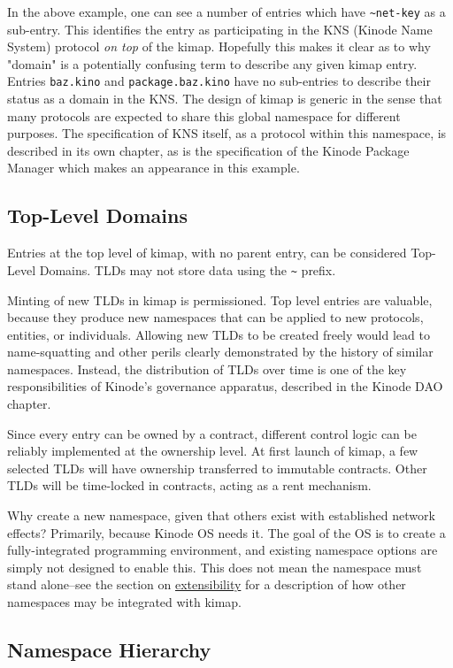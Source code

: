 \documentclass[runningheads]{llncs}
\begin{document}
In the above example, one can see a number of entries which have \verb|~net-key| as a sub-entry.
This identifies the entry as participating in the KNS (Kinode Name System) protocol \textit{on top} of the kimap.
Hopefully this makes it clear as to why "domain" is a potentially confusing term to describe any given kimap entry.
Entries \verb|baz.kino| and \verb|package.baz.kino| have no sub-entries to describe their status as a domain in the KNS.
The design of kimap is generic in the sense that many protocols are expected to share this global namespace for different purposes.
The specification of KNS itself, as a protocol within this namespace, is described in its own chapter, as is the specification of the Kinode Package Manager which makes an appearance in this example.

\subsection{Top-Level Domains}

Entries at the top level of kimap, with no parent entry, can be considered Top-Level Domains.
TLDs may not store data using the \verb|~| prefix.

Minting of new TLDs in kimap is permissioned.
Top level entries are valuable, because they produce new namespaces that can be applied to new protocols, entities, or individuals.
Allowing new TLDs to be created freely would lead to name-squatting and other perils clearly demonstrated by the history of similar namespaces.
Instead, the distribution of TLDs over time is one of the key responsibilities of Kinode's governance apparatus, described in the Kinode DAO chapter.

Since every entry can be owned by a contract, different control logic can be reliably implemented at the ownership level.
At first launch of kimap, a few selected TLDs will have ownership transferred to immutable contracts.
Other TLDs will be time-locked in contracts, acting as a rent mechanism.

Why create a new namespace, given that others exist with established network effects?
Primarily, because Kinode OS needs it.
The goal of the OS is to create a fully-integrated programming environment, and existing namespace options are simply not designed to enable this.
This does not mean the namespace must stand alone–see the section on \hyperref[sec:extensibility]{extensibility} for a description of how other namespaces may be integrated with kimap.

\subsection{Namespace Hierarchy}
\end{document}
